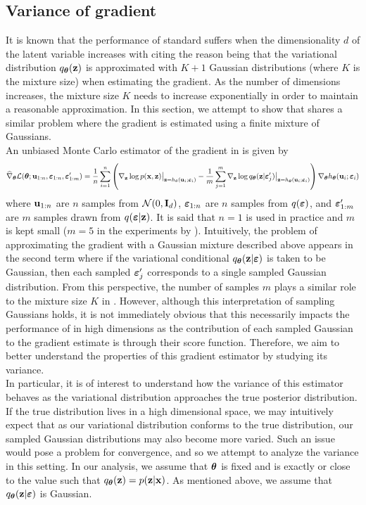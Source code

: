 \documentclass[10pt]{article}
\begin{document}
\subsection{Variance of gradient} \label{sec:variance}

It is known that the performance of standard \sivi suffers when the dimensionality $d$ of the latent variable increases with \citet{Molchanova:2019} citing the reason being that the variational distribution $q_{\bm{\theta}}(\mathbf{z})$ is approximated with $K+1$ Gaussian distributions (where $K$ is the mixture size) when estimating the \elbo gradient. As the number of dimensions increases, the mixture size $K$ needs to increase exponentially in order to maintain a reasonable approximation. In this section, we attempt to show that \uivi shares a similar problem where the \elbo gradient is estimated using a finite mixture of Gaussians. \todo
\\

An unbiased Monte Carlo estimator of the \elbo gradient in \uivi is given by
\[
\widehat{\nabla}_{\bm{\theta}}\mathcal{L}({\bm{\theta}};\mathbf{u}_{1:n},\bm{\varepsilon}_{1:n},\bm{\varepsilon}_{1:m}') = \frac{1}{n}\sum_{i=1}^n \left(\nabla_{\mathbf{z}}\log p(\mathbf{x},\mathbf{z})\big|_{\mathbf{z}=h_\theta(\mathbf{u}_i;\bm{\varepsilon}_i)} - \frac{1}{m}\sum_{j=1}^m \nabla_{\mathbf{z}}\log q_{\bm{\theta}}(\mathbf{z}|\bm{\varepsilon}_j')\big|_{\mathbf{z}=h_{\bm{\theta}}(\mathbf{u}_i;\bm{\varepsilon}_i)} \right)\nabla_{\bm{\theta}} h_{\bm{\theta}}(\mathbf{u}_i;\bm{\varepsilon}_i)
\]
where $\mathbf{u}_{1:n}$ are $n$ \iid samples from $\mathcal{N}(0,\mathbf{I}_d)$, $\bm{\varepsilon}_{1:n}$ are $n$ \iid samples from $q(\bm{\varepsilon})$, and $\bm{\varepsilon}_{1:m}'$ are $m$ \mcmc samples drawn from $q(\bm{\varepsilon}|\mathbf{z})$. It is said that $n=1$ is used in practice and $m$ is kept small ($m=5$ in the experiments by \citet{Titsias:2019}). Intuitively, the problem of approximating the \elbo gradient with a Gaussian mixture described above appears in the second term where if the variational conditional $q_{\bm{\theta}}(\mathbf{z}|\bm{\varepsilon})$ is taken to be Gaussian, then each sampled $\bm{\varepsilon}_j'$ corresponds to a single sampled Gaussian distribution. From this perspective, the number of samples $m$ plays a similar role to the mixture size $K$ in \sivi. However, although this interpretation of sampling Gaussians holds, it is not immediately obvious that this necessarily impacts the performance of \uivi in high dimensions as the contribution of each sampled Gaussian to the gradient estimate is through their score function. Therefore, we aim to better understand the properties of this gradient estimator by studying its variance.
\\

In particular, it is of interest to understand how the variance of this estimator behaves as the variational distribution approaches the true posterior distribution. If the true distribution lives in a high dimensional space, we may intuitively expect that as our variational distribution conforms to the true distribution, our sampled Gaussian distributions may also become more varied. Such an issue would pose a problem for convergence, and so we attempt to analyze the variance in this setting. In our analysis, we assume that ${\bm{\theta}}$ is fixed and is exactly or close to the value such that $q_{\bm{\theta}}(\mathbf{z})=p(\mathbf{z}|\mathbf{x})$. As mentioned above, we assume that $q_{\bm{\theta}}(\mathbf{z}|\bm{\varepsilon})$ is Gaussian.
\\
\end{document}
